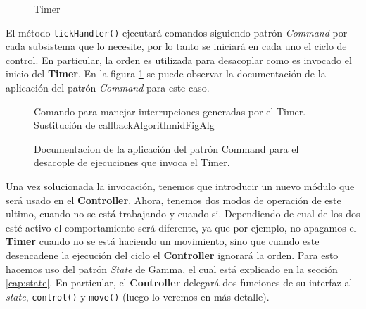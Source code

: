 \begin{figure}[h]
\caption{Timer}
\begin{center}
\end{center}
\end{figure}

El método \verb|tickHandler()| ejecutará comandos siguiendo patrón \textit{Command} por cada subsistema que lo necesite, por lo tanto se iniciará en cada uno el ciclo de control. En particular, la orden es utilizada para desacoplar como es invocado el inicio del \textbf{Timer}. En la figura \ref{docCommandTimer} se puede observar la documentación de la aplicación del patrón \textit{Command} para este caso.

\begin{figure}
\caption{Documentacion de la aplicación del patrón Command para el desacople de ejecuciones que invoca el Timer.}
\label{docCommandTimer}
\begin{pattern}[]{Comando para manejar interrupciones generadas por el Timer.
Sustitución de callback}{Algorithm}{idFigAlg}
\assigns
{}
\end{pattern}
\end{figure}


Una vez solucionada la invocación, tenemos que introducir un nuevo módulo que será usado en el \textbf{Controller}. Ahora, tenemos dos modos de operación de este ultimo, cuando no se está trabajando y cuando si. Dependiendo de cual de los dos esté activo el comportamiento será diferente, ya que por ejemplo, no apagamos el \textbf{Timer} cuando no se está haciendo un movimiento, sino que cuando este desencadene la ejecución del ciclo el \textbf{Controller} ignorará la orden. Para esto hacemos uso del patrón \textit{State} de Gamma\cite{Gamma:1995:DPE:186897}, el cual está explicado en la sección \ref{cap:state}. En particular, el \textbf{Controller} delegará dos funciones de su interfaz al \textit{state}, \verb|control()| y \verb|move()| (luego lo veremos en más detalle).

